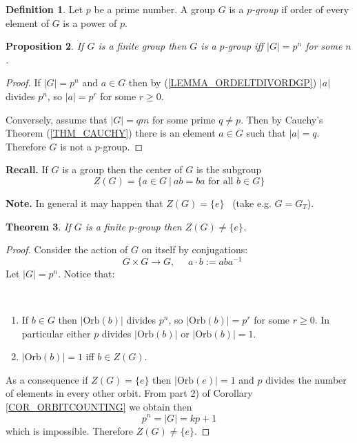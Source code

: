 \documentclass[12pt, letterpaper, oneside]{article}
\theoremstyle{plain}
\newtheorem{theorem}{Theorem}[section]
\newtheorem{proposition}[theorem]{Proposition}
\theoremstyle{definition}
\newtheorem{definition}[theorem]{Definition}
\newcommand{\Orb}{\mathrm{Orb}}
\newcommand{\benu}{\begin{enumerate}}
\newcommand{\eenu}{\end{enumerate}}
\newcommand{\vs}{\vskip 5mm}
\begin{document}
\vs\vs

\begin{definition}
Let $p$ be a prime number. A group $G$ is a \emph{$p$-group} if order of every element 
of $G$ is a power of $p$.
\end{definition}


\vs

\begin{proposition}
If $G$ is a finite group then $G$ is a $p$-group iff $|G|= p^{n}$ for some $n$.
\end{proposition}


\begin{proof}
If $|G| = p^{n}$ and $a\in G$ then by (\ref{LEMMA_ORDELTDIVORDGP}) 
$|a|$ divides $p^{n}$, so $|a|= p^{r}$ for some $r\geq 0$.

Conversely, assume that $|G| = qm$ for some prime $q\neq p$. Then by Cauchy's 
Theorem (\ref{THM_CAUCHY}) there is an element $a\in G$ such that $|a|= q$. 
Therefore $G$ is not a $p$-group. 
\end{proof}

\vs\vs


\textbf{Recall.} If $G$ is a group then the center of $G$ is the subgroup 
$$Z(G) = \{ a\in G \ | \ ab = ba \text{ for all } b\in G \}$$


\textbf{Note.} In general it may happen that $Z(G) = \{e\}$ \ (take e.g. $G= G_{T}$). 

\vs\vs

\begin{theorem}
\label{THM_NONTRIVPCENTER}
If $G$ is a finite $p$-group then $Z(G)\neq \{e \}$.
\end{theorem}


\begin{proof}
Consider the action of $G$ on itself by conjugations:
$$\ \ \ G\times G \to G, \ \ \ \ \ \ a\cdot b := aba^{-1}$$
Let $|G| = p^{n}$. Notice that: 

\vskip -13mm

\ 
\benu
\item If $b\in G$ then $|\Orb(b)|$ divides $p^{n}$, so $|\Orb(b)| = p^{r}$
for some $r\geq 0$. In particular  either $p$  divides $|\Orb(b)|$ or  $|\Orb(b)| =1$.

\item $|\Orb(b)|=1$ iff $b\in Z(G)$. 
 
 \eenu


As a consequence if $Z(G) = \{e\}$  then $|\Orb(e)| = 1$ and $p$ divides the number of 
elements in every other orbit.  From part 2) of Corollary \ref{COR_ORBITCOUNTING}
we obtain then
$$p^{n} = |G| = kp +1$$
which is impossible. Therefore $Z(G) \neq \{e\}$.

\end{proof}
\end{document}
